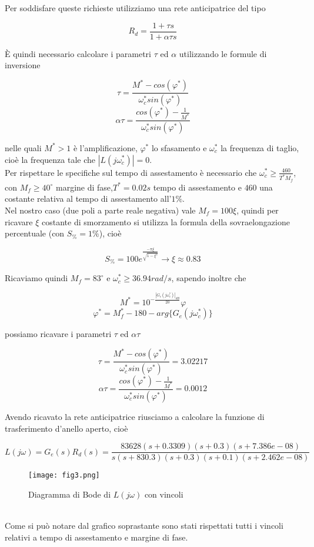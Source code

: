 \documentclass{article}
\begin{document}
Per soddisfare queste richieste utilizziamo una rete anticipatrice del tipo
\begin{large}
\[
R_d=\frac{1+\tau s}{1 + \alpha\tau s}
\]
\end{large}
È quindi necessario calcolare i parametri $\tau$ ed $\alpha$ utilizzando le formule di inversione
\begin{large}
\[
\tau=\frac{M^*-cos(\varphi^*)}{\omega_c^* sin(\varphi^*)}
\]
\[
\alpha\tau=\frac{cos(\varphi^*)-\frac{1}{M^*}}{\omega_c^* sin(\varphi^*)}
\]
\end{large}
nelle quali $M^* > 1$ è l'amplificazione, $\varphi^*$ lo sfasamento e $\omega_c^*$ la frequenza di taglio, cioè la frequenza tale che $|L(j\omega_c^*)|=0$.\\Per rispettare le specifiche sul tempo di assestamento è necessario che $\omega_c^*\geq \frac{460}{T^*M_f}$, con $M_f\geq40^{\circ}$ margine di fase,$T^*=0.02 s$ tempo di assestamento e $460$ una costante relativa al tempo di assestamento all'$1\%$.\\
Nel nostro caso (due poli a parte reale negativa) vale $M_f=100\xi$, quindi per ricavare $\xi$ costante di smorzamento si utilizza la formula della sovraelongazione percentuale (con $S_\%=1\%$), cioè 
\begin{large}
\[
S_\%=100 e^{\frac{-\pi\xi}{\sqrt{1-\xi^2}}} \longrightarrow \xi\approx 0.83
\]
\end{large}
Ricaviamo quindi $M_f=83^{\circ}$ e $\omega_c^*\geq 36.94 rad/s$, sapendo inoltre che
\begin{large}
\[
M^*=10^{-\frac{|G_e(j\omega_c^*)|_{dB}}{20}}
\varphi
\]
\[
\varphi^*=M_f^*-180-arg\{G_e(j\omega_c^*)\}
\]
\end{large}
possiamo ricavare i parametri $\tau$ ed $\alpha\tau$
\begin{large}
\[
\tau=\frac{M^*-cos(\varphi^*)}{\omega_c^* sin(\varphi^*)}=3.02217
\]
\[
\alpha\tau=\frac{cos(\varphi^*)-\frac{1}{M^*}}{\omega_c^* sin(\varphi^*)}=0.0012
\]
\end{large}
Avendo ricavato la rete anticipatrice riusciamo a calcolare la funzione di trasferimento d'anello aperto, cioè
\begin{large}
\[
L(j\omega)=G_e(s)R_d(s)=\frac{83628 (s+0.3309) (s+0.3) (s+7.386e-08)}{s (s+830.3) (s+0.3) (s+0.1) (s+2.462e-08)}
\]
\end{large}
\begin{figure}[!h]
\centering
\texttt{[image: fig3.png]}
\caption{\label{fig:orbit}Diagramma di Bode di $L(j\omega)$ con vincoli}
\end{figure}\\
Come si può notare dal grafico soprastante sono stati rispettati tutti i vincoli relativi a tempo di assestamento e margine di fase.
\pagebreak
\end{document}
